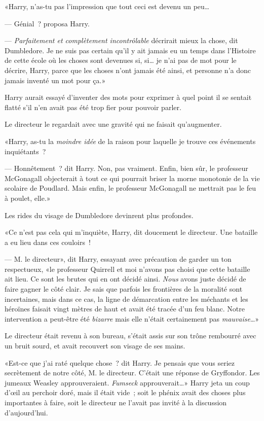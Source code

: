 «Harry, n'as-tu pas l'impression que tout ceci est devenu un peu…

--- Génial~? proposa Harry.

--- \emph{Parfaitement et complètement incontrôlable} décrirait mieux la chose, dit Dumbledore. Je ne suis pas certain qu'il y ait jamais eu un temps dans l'Histoire de cette école où les choses sont devenues si, si… je n'ai pas de mot pour le décrire, Harry, parce que les choses n'ont jamais été ainsi, et personne n'a donc jamais inventé un mot pour ça.»

Harry aurait essayé d'inventer des mots pour exprimer à quel point il se sentait flatté s'il n'en avait pas été trop fier pour pouvoir parler.

Le directeur le regardait avec une gravité qui ne faisait qu'augmenter.

«Harry, as-tu la \emph{moindre idée} de la raison pour laquelle je trouve ces événements inquiétants~?

--- Honnêtement~? dit Harry. Non, pas vraiment. Enfin, bien sûr, le professeur McGonagall objecterait à tout ce qui pourrait briser la morne monotonie de la vie scolaire de Poudlard. Mais enfin, le professeur McGonagall ne mettrait pas le feu à poulet, elle.»

Les rides du visage de Dumbledore devinrent plus profondes.

«Ce n'est pas cela qui m'inquiète, Harry, dit doucement le directeur. Une bataille a eu lieu dans ces couloirs~!

--- M. le directeur», dit Harry, essayant avec précaution de garder un ton respectueux, «le professeur Quirrell et moi n'avons pas choisi que cette bataille ait lieu. Ce sont les brutes qui en ont décidé ainsi. \emph{Nous} avons juste décidé de faire gagner le côté clair. Je sais que parfois les frontières de la moralité sont incertaines, mais dans ce cas, la ligne de démarcation entre les méchants et les héroïnes faisait vingt mètres de haut et avait été tracée d'un feu blanc. Notre intervention a peut-être été \emph{bizarre} mais elle n'était certainement pas \emph{mauvaise}…»

Le directeur était revenu à son bureau, s'était assis sur son trône rembourré avec un bruit sourd, et avait recouvert son visage de ses mains.

«Est-ce que j'ai raté quelque chose~? dit Harry. Je pensais que vous seriez secrètement de notre côté, M. le directeur. C'était une réponse de Gryffondor. Les jumeaux Weasley approuveraient. \emph{Fumseck} approuverait…» Harry jeta un coup d'œil au perchoir doré, mais il était vide~; soit le phénix avait des choses plus importantes à faire, soit le directeur ne l'avait pas invité à la discussion d'aujourd'hui.

